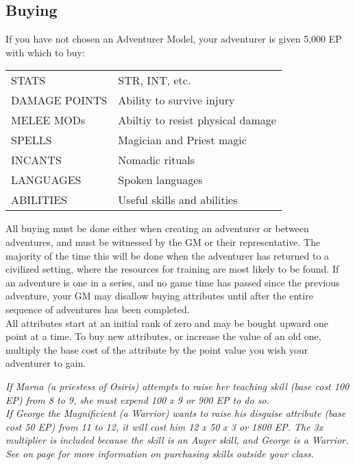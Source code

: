 \begin{multicols*}{2}
\section{Buying}
\label{create-buying}
If you have not chosen an Adventurer Model, your adventurer is given 5,000 EP with which to buy:
\begin{tcolorbox}[breakable,boxrule=0pt,title=\textbf{Things You Can Purchase WWith Experience}]
\begin{tabular}{@{}l l}
STATS & STR, INT, etc.\\
DAMAGE POINTS  & Ability to survive injury\\
MELEE MODs & Abiltiy to resist physical damage\\
SPELLS & Magician and Priest magic\\
INCANTS & Nomadic rituals\\
LANGUAGES & Spoken languages\\
ABILITIES & Useful skills and abilities\\
\end{tabular}
\end{tcolorbox}
All buying must be done either when creating an adventurer or between adventures, and must be witnessed by the GM or their representative. The majority of the time this will be done when the adventurer has returned to a civilized setting, where the resources for training are most likely to be found. If an adventure is one in a series, and no game time has passed since the previous adventure, your GM may disallow buying attributes until after the entire sequence of adventures has been completed. \\
All attributes start at an initial rank of zero and may be bought upward one point at a time. To buy new attributes, or increase the value of an old one, multiply the base cost of the attribute by the point value you wish your adventurer to gain.

\textit{If Marna (a priestess of Osiris) attempts to raise her teaching skill (base cost 100 EP) from 8 to 9, she must expend 100 x 9 or 900 EP to do so.\\
If George the Magnificient (a Warrior) wants to raise his disguise attribute (base cost 50 EP) from 11 to 12, it will cost him 12 x 50 x 3 or 1800 EP. The 3x multiplier is included because the skill is an Auger skill, and George is a Warrior. See  on page \textbf{\pageref{create-skills}} for more information on purchasing skills outside your class.}

\end{multicols*}
